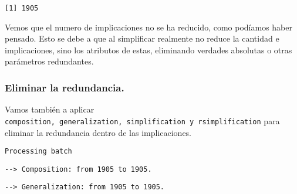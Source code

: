 \documentclass[
  letterpaper,
  DIV=11,
  numbers=noendperiod]{scrreprt}
\newenvironment{Shaded}{\begin{snugshade}}{\end{snugshade}}
\newcommand{\AttributeTok}[1]{\textcolor[rgb]{0.40,0.45,0.13}{#1}}
\newcommand{\FunctionTok}[1]{\textcolor[rgb]{0.28,0.35,0.67}{#1}}
\newcommand{\NormalTok}[1]{\textcolor[rgb]{0.00,0.23,0.31}{#1}}
\newcommand{\SpecialCharTok}[1]{\textcolor[rgb]{0.37,0.37,0.37}{#1}}
\newcommand{\StringTok}[1]{\textcolor[rgb]{0.13,0.47,0.30}{#1}}
\begin{document}
\begin{Shaded}
\end{Shaded}

\begin{verbatim}
[1] 1905
\end{verbatim}

Vemos que el numero de implicaciones no se ha reducido, como podíamos
haber pensado. Esto se debe a que al simplificar realmente no reduce la
cantidad e implicaciones, sino los atributos de estas, eliminando
verdades absolutas o otras parámetros redundantes.

\subsubsection{Eliminar la redundancia.}\label{eliminar-la-redundancia.}

Vamos también a aplicar
\texttt{composition,\ generalization,\ simplification\ y\ rsimplification}
para eliminar la redundancia dentro de las implicaciones.

\begin{Shaded}
\end{Shaded}

\begin{verbatim}
Processing batch
\end{verbatim}

\begin{verbatim}
--> Composition: from 1905 to 1905.
\end{verbatim}

\begin{verbatim}
--> Generalization: from 1905 to 1905.
\end{verbatim}
\end{document}
